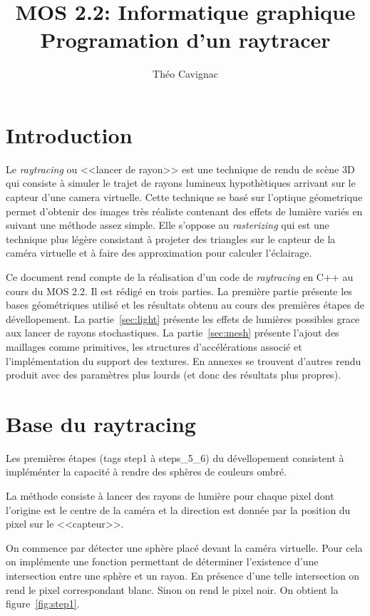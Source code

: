 \documentclass[12pt]{article}
\title{MOS 2.2: Informatique graphique\\
Programation d'un raytracer}
\author{Théo Cavignac}
\newcommand{\raytracing}{\textit{raytracing}}
\begin{document}
\maketitle

\section*{Introduction}

Le \raytracing{} ou <<lancer de rayon>> est une technique de rendu de scène 3D qui consiste à simuler le trajet de rayons lumineux hypothètiques arrivant sur le capteur d'une camera virtuelle.
Cette technique se basé sur l'optique géometrique permet d'obtenir des images très réaliste contenant des effets de lumière variés en suivant une méthode assez simple.
Elle s'oppose au \textit{rasterizing} qui est une technique plus légère consistant à projeter des triangles sur le capteur de la caméra virtuelle et à faire des approximation pour calculer l'éclairage.

Ce document rend compte de la réalisation d'un code de \raytracing{} en C++ au cours du MOS 2.2.
Il est rédigé en trois parties.
La première partie présente les bases géométriques utilisé et les résultats obtenu au cours des premières étapes de dévellopement.
La partie~\ref{sec:light} présente les effets de lumières possibles grace aux lancer de rayons stochastiques.
La partie~\ref{sec:mesh} présente l'ajout des maillages comme primitives, les structures d'accélérations associé et l'implémentation du support des textures.
En annexes se trouvent d'autres rendu produit avec des paramètres plus lourds (et donc des résultats plus propres).

\section{Base du raytracing\label{sec:basics}}
Les premières étapes (tags step1 à steps\_5\_6) du dévellopement consistent à impléménter la capacité à rendre des sphères de couleurs ombré.

La méthode consiste à lancer des rayons de lumière pour chaque pixel dont l'origine est le centre de la caméra et la direction est donnée par la position du pixel sur le <<capteur>>.

On commence par détecter une sphère placé devant la caméra virtuelle.
Pour cela on implémente une fonction permettant de déterminer l'existence d'une intersection entre une sphère et un rayon.
En présence d'une telle intersection on rend le pixel correspondant blanc.
Sinon on rend le pixel noir. On obtient la figure~\ref{fig:step1}.
\end{document}
